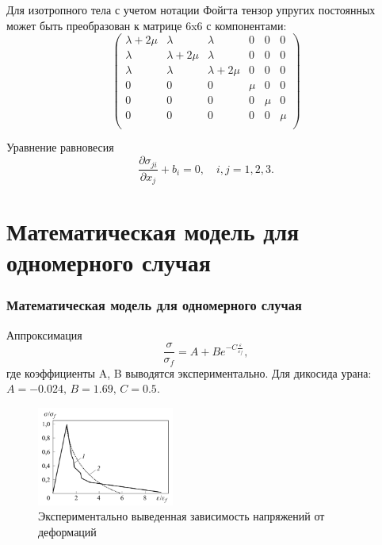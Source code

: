 \documentclass[unicode, 8pt]{beamer}
\begin{document}
    \begin{frame}
        \begin{block}{}
            Для изотропного тела с учетом нотации Фойгта тензор упругих постоянных может быть преобразован к матрице $6$x$6$ с компонентами:
            \[
                \begin{pmatrix}
                    \lambda + 2\mu & \lambda & \lambda & 0 & 0 & 0 \\
                    \lambda & \lambda + 2\mu & \lambda & 0 & 0 & 0 \\
                    \lambda & \lambda & \lambda + 2\mu & 0 & 0 & 0 \\
                         0 &      0 &      0 & \mu & 0 & 0 \\
                         0 &      0 &      0 & 0 & \mu & 0 \\
                         0 &      0 &      0 & 0 & 0 & \mu \\
                  \end{pmatrix} 
            \]
        \end{block}

        \begin{block}{Уравнение равновесия}
            \fontsize{10.4pt}{12pt}\selectfont
            \[
              \dfrac{\partial \sigma_{ji}}{\partial x_j} + b_i = 0, \quad i,j = 1, 2, 3.
            \]
        \end{block}
    \end{frame}

    \section{Математическая модель для одномерного случая}
    \begin{frame}        
        \frametitle{Математическая модель для одномерного случая}
        \begin{block}{Аппроксимация}
            \[
              \dfrac{\sigma}{\sigma_f} = A + B e^{-C \tfrac{\varepsilon}{\varepsilon_f}},
            \]
            \noindent где коэффициенты A, B выводятся экспериментально. Для дикосида урана:
            $
              A = -0.024,\, B = 1.69, \, C = 0.5.  
            $
        \end{block} 
        \begin{figure}
            \centering
            \includegraphics[width=0.4\textwidth]{ceramic.jpeg}
            \caption{Экспериментально выведенная зависимость напряжений от деформаций}
        \end{figure}
    \end{frame}
\end{document}
